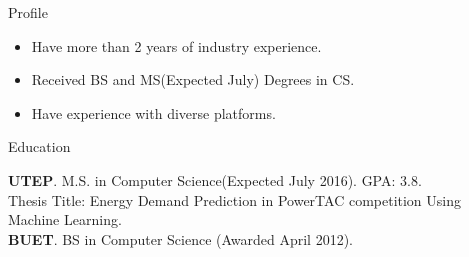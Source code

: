 \documentclass[]{mcdowellcv}
\begin{document}
	\makeheader
	
	\begin{cvsection}{Profile}
	\begin{cvsubsection}{}{}{}
		\begin{itemize}
				\item Have more than 2 years of industry experience.
				\item Received BS and MS(Expected July) Degrees in CS.
				\item Have experience with diverse platforms.
			\end{itemize}
	\end{cvsubsection}
	\end{cvsection}
	
	\begin{cvsection}{Education}
		\begin{cvsubsection}{}{}{}
				\textbf{UTEP}. M.S. in Computer Science(Expected July 2016). GPA: 3.8. \\
				Thesis Title: Energy Demand Prediction in PowerTAC competition Using Machine Learning. \\
				\textbf{BUET}. BS in Computer Science (Awarded April 2012). 
		\end{cvsubsection}
	\end{cvsection}
\end{document}
